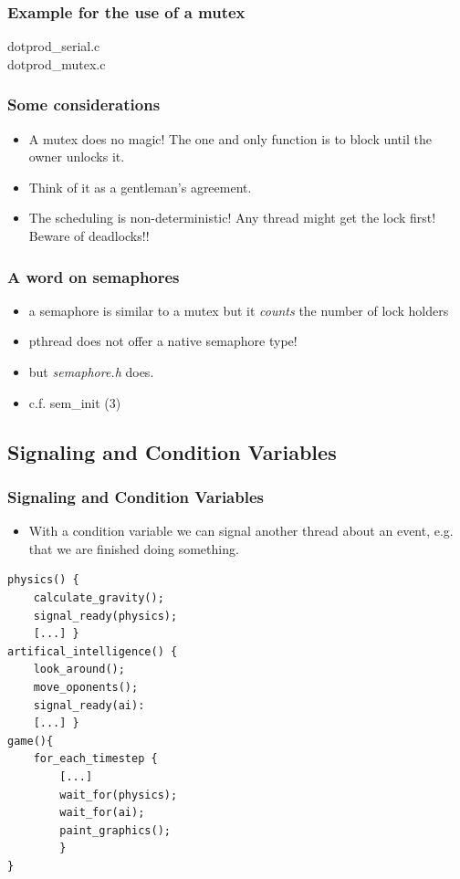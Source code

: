 \documentclass[10pt]{beamer}
\begin{document}
\begin{frame}
    \frametitle{Example for the use of a mutex}
    dotprod\_serial.c \\
    dotprod\_mutex.c
\end{frame}

\begin{frame}
    \frametitle{Some considerations}
    \begin{itemize}
        \item A mutex does no magic! The one and only function is to block until the owner unlocks it.
        \item Think of it as a gentleman's agreement.
        \item The scheduling is non-deterministic! Any thread might get the lock first! Beware of deadlocks!!
    \end{itemize}
\end{frame}

\begin{frame}
    \frametitle{A word on semaphores}
    \begin{itemize}
        \item a semaphore is similar to a mutex but it \emph{counts} the number of lock holders
        \item pthread does not offer a native semaphore type!
        \item but {\it semaphore.h} does.
        \item c.f. sem\_init (3)
    \end{itemize}
\end{frame}



\subsection{Signaling and Condition Variables}
    

\begin{frame}[fragile]
    \frametitle{Signaling and Condition Variables}
    \begin{itemize}
        \item With a condition variable we can signal another thread about an event, e.g. that we are finished doing something.
    \end{itemize}
\begin{block}{}
\begin{lstlisting}
physics() {
    calculate_gravity();
    signal_ready(physics);
    [...] }
artifical_intelligence() {
    look_around();
    move_oponents();
    signal_ready(ai):
    [...] }
game(){
    for_each_timestep {
        [...]
        wait_for(physics);
        wait_for(ai);
        paint_graphics();
        }
}
\end{lstlisting}
\end{block}
\end{frame}
\end{document}
